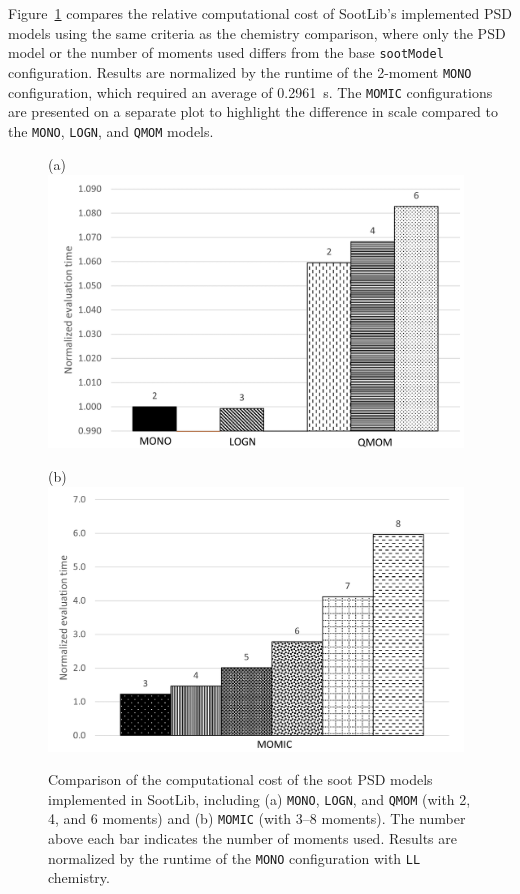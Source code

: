 \documentclass[preprint,letterpaper]{elsarticle}
\begin{document}
Figure~\ref{f:cost_PSD} compares the relative computational cost of SootLib's implemented PSD models using the same criteria as the chemistry comparison, where only the PSD model or the number of moments used differs from the base \texttt{sootModel} configuration. Results are normalized by the runtime of the 2-moment \texttt{MONO} configuration, which required an average of 0.2961~\si{s}.
The \texttt{MOMIC} configurations are presented on a separate plot to highlight the difference in scale compared to the \texttt{MONO}, \texttt{LOGN}, and \texttt{QMOM} models.
\begin{figure}
    \begin{minipage}{0.5\textwidth}
        \centering
        (a) \\ \includegraphics[width=0.98\textwidth]{../figures/comp_cost_PSDa}
    \end{minipage}
    \begin{minipage}{0.5\textwidth}
        \centering
        (b) \\ \includegraphics[width=0.98\textwidth]{../figures/comp_cost_PSDb}
    \end{minipage}
    \caption{Comparison of the computational cost of the soot PSD models implemented in SootLib, including (a) \texttt{MONO}, \texttt{LOGN}, and \texttt{QMOM} (with 2, 4, and 6 moments) and (b) \texttt{MOMIC} (with 3--8 moments). The number above each bar indicates the number of moments used. Results are normalized by the runtime of the \texttt{MONO} configuration with \texttt{LL} chemistry.}
    \label{f:cost_PSD}
\end{figure}
\end{document}
